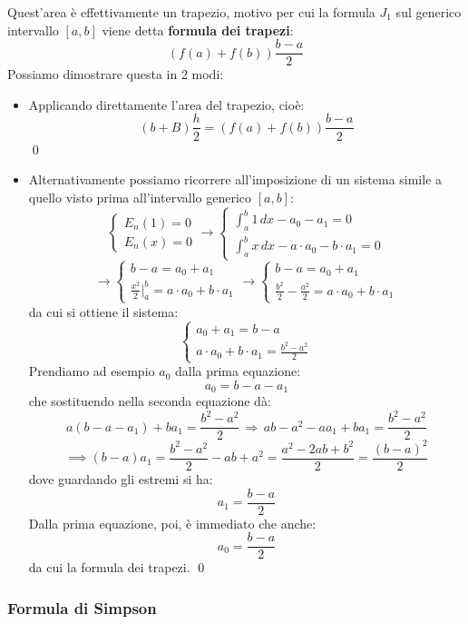 \documentclass[a4paper,11pt]{article}
\begin{document}
Quest'area è effettivamente un trapezio, motivo per cui la formula $J_1$ sul generico intervallo $[a, b]$ viene detta \textbf{formula dei trapezi}:
$$
\left(f(a) + f(b)\right) \frac{b - a}{2}
$$
Possiamo dimostrare questa in 2 modi:
\begin{itemize}
	\item Applicando direttamente l'area del trapezio, cioè:
		$$
		(b + B) \frac{h}{2} = \left(f(a) + f(b)\right) \frac{b - a}{2}
		$$ \qed
	\item Alternativamente possiamo ricorrere all'imposizione di un sistema simile a quello visto prima all'intervallo generico $[a, b]$:
\[
	\begin{cases}
		E_n(1) = 0 \\ 
		E_n(x) = 0
	\end{cases}
	\rightarrow
	\begin{cases}
		\int_a^b 1 \, dx - a_0 - a_1 = 0 \\ 
		\int_a^b x \, dx - a \cdot a_0 - b \cdot a_1 = 0
	\end{cases}
\]
\[
	\rightarrow
	\begin{cases}
		b - a = a_0 + a_1 \\ 
		\frac{x^2}{2} \Big|^b_a = a \cdot a_0 + b \cdot a_1 
	\end{cases}
	\rightarrow
	\begin{cases}
		b - a = a_0 + a_1 \\ 
		\frac{b^2}{2} - \frac{a^2}{2} = a \cdot a_0 + b \cdot a_1 
	\end{cases}
\]
da cui si ottiene il sistema:
\[
	\begin{cases}
		a_0 + a_1 = b - a \\ 
		a \cdot a_0 + b \cdot a_1 = \frac{b^2 - a^2}{2}
	\end{cases}
\]
Prendiamo ad esempio $a_0$ dalla prima equazione:
$$
a_0 = b - a - a_1
$$
che sostituendo nella seconda equazione dà:
$$
a(b - a - a_1) + b a_1 = \frac{b^2 - a^2}{2} \, \Rightarrow \, ab - a^2 - aa_1 + ba_1 = \frac{b^2 - a^2}{2}
$$
$$
\implies (b - a) a_1 = \frac{b^2 - a^2}{2} - ab + a^2 = \frac{a^2 - 2ab + b^2}{2} = \frac{(b - a)^2}{2}
$$
dove guardando gli estremi si ha:
$$
a_1 = \frac{b - a}{2}
$$
Dalla prima equazione, poi, è immediato che anche:
$$
a_0 = \frac{b - a}{2}
$$
da cui la formula dei trapezi. \qed
\end{itemize}

\subsubsection{Formula di Simpson}
\end{document}
